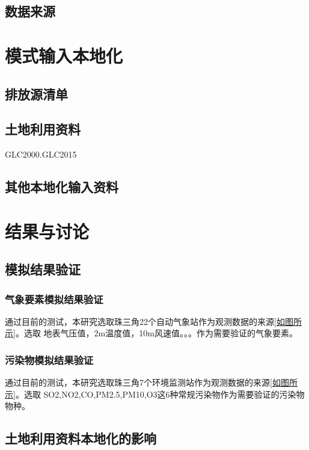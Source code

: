 \documentclass[a4paper]{article}
\begin{document}
\subsection{数据来源}

\section{模式输入本地化}
\subsection{排放源清单}
\subsection{土地利用资料}
GLC2000.GLC2015
\subsection{其他本地化输入资料}
\section{结果与讨论}
\subsection{模拟结果验证}
\subsubsection{气象要素模拟结果验证}
通过目前的测试，本研究选取珠三角22个自动气象站作为观测数据的来源\ref{如图所示}。选取
地表气压值，2m温度值，10m风速值。。。作为需要验证的气象要素。
\subsubsection{污染物模拟结果验证}
通过目前的测试，本研究选取珠三角7个环境监测站作为观测数据的来源\ref{如图所示}。选取
SO2,NO2,CO,PM2.5,PM10,O3这6种常规污染物作为需要验证的污染物物种。
\subsection{土地利用资料本地化的影响}
\end{document}
